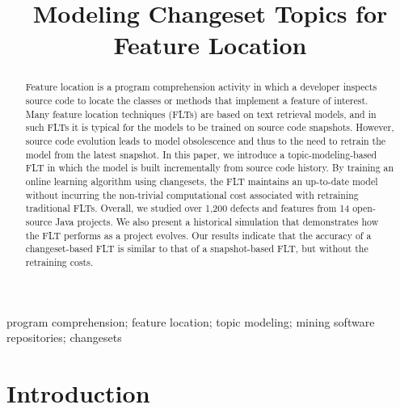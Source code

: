 \documentclass[conference]{IEEEtran}
\begin{document}
\title{Modeling Changeset Topics for Feature Location}
\author{
    \and
}


\maketitle

\begin{abstract}
Feature location is a program comprehension activity in which a developer
inspects source code to locate the classes or methods that implement a feature of interest.
Many feature location techniques (FLTs) are based on text retrieval models, and
in such FLTs it is typical for the models to be trained on source code snapshots.
However, source code evolution leads to model obsolescence and
thus to the need to retrain the model from the latest snapshot.
In this paper, we introduce a topic-modeling-based FLT in which the model
is built incrementally from source code history.
By training an online learning algorithm using changesets, the FLT
maintains an up-to-date model without incurring the non-trivial computational cost associated with retraining traditional FLTs.
Overall, we studied over 1,200 defects and features from 14 open-source Java projects.
We also present a historical simulation that demonstrates how the FLT performs as a project evolves.
Our results indicate that the accuracy of a changeset-based FLT is similar to that of a snapshot-based FLT, but without the retraining costs.
\end{abstract}

\begin{IEEEkeywords}
program comprehension;
feature location;
topic modeling;
mining software repositories;
changesets
\end{IEEEkeywords}

\section{Introduction}
\label{sec:intro}

\end{document}
